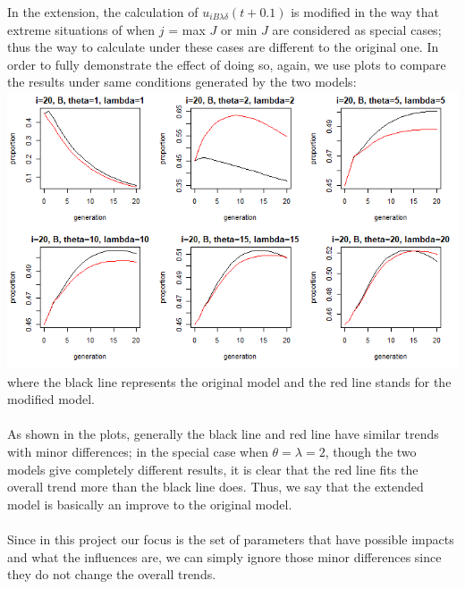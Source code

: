 \documentclass[a4paper,8pt]{extarticle}
\begin{document}
In the extension, the calculation of $u_{iB\lambda\delta}(t + 0.1)$ is modified in the way that extreme situations of when $j$ = max $J$ or min $J$ are considered as special cases; thus the way to calculate under these cases are different to the original one. In order to fully demonstrate the effect of doing so, again, we use plots to compare the results under same conditions generated by the two models:
\\
\includegraphics[scale = 0.6]{compare.png}
\\
where the black line represents the original model and the red line stands for the modified model.
\\
\\
As shown in the plots, generally the black line and red line have similar trends with minor differences; in the special case when $\theta = \lambda = 2$, though the two models give completely different results, it is clear that the red line fits the overall trend more than the black line does. Thus, we say that the extended model is basically an improve to the original model.
\\
\\
Since in this project our focus is the set of parameters that have possible impacts and what the influences are, we can simply ignore those minor differences since they do not change the overall trends. 
\end{document}
